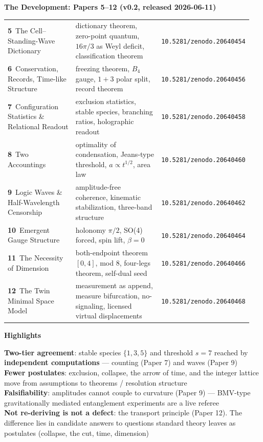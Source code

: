 \documentclass[9pt]{extarticle}
\newcommand{\secrule}[1]{{\large\bfseries\textcolor{acc}{#1}}\par\vspace{1pt}{\color{acc}\rule{\linewidth}{1.2pt}}\par\vspace{3pt}}
\newcommand{\doi}[1]{{\footnotesize\texttt{#1}}}
\begin{document}
\newpage
\begin{minipage}[t]{0.64\textwidth}
\secrule{The Development: Papers 5--12 (v0.2, released 2026-06-11)}
{\small
\begin{tabular}{@{}p{0.30\linewidth}p{0.43\linewidth}p{0.22\linewidth}@{}}
\textbf{5}\ The Cell--Standing-Wave Dictionary & dictionary theorem, zero-point quantum, $16\pi/3$ as Weyl deficit, classification theorem & \doi{10.5281/zenodo.20640454}\\[2pt]
\textbf{6}\ Conservation, Records, Time-like Structure & freezing theorem, $B_4$ gauge, $1{+}3$ polar split, record theorem & \doi{10.5281/zenodo.20640456}\\[2pt]
\textbf{7}\ Configuration Statistics \& Relational Readout & exclusion statistics, stable species, branching ratios, holographic readout & \doi{10.5281/zenodo.20640458}\\[2pt]
\textbf{8}\ Two Accountings & optimality of condensation, Jeans-type threshold, $a\propto t^{1/2}$, area law & \doi{10.5281/zenodo.20640460}\\[2pt]
\textbf{9}\ Logic Waves \& Half-Wavelength Censorship & amplitude-free coherence, kinematic stabilization, three-band structure & \doi{10.5281/zenodo.20640462}\\[2pt]
\textbf{10}\ Emergent Gauge Structure & holonomy $\pi/2$, SO(4) forced, spin lift, $\beta=0$ & \doi{10.5281/zenodo.20640464}\\[2pt]
\textbf{11}\ The Necessity of Dimension & both-endpoint theorem $[0,4]$, mod 8, four-legs theorem, self-dual seed & \doi{10.5281/zenodo.20640466}\\[2pt]
\textbf{12}\ The Twin Minimal Space Model & measurement as append, measure bifurcation, no-signaling, licensed virtual displacements & \doi{10.5281/zenodo.20640468}\\
\end{tabular}}
\end{minipage}\hfill
\begin{minipage}[t]{0.33\textwidth}
\secrule{Highlights}
{\small
\textbf{Two-tier agreement}: stable species $\{1,3,5\}$ and threshold $s=7$ reached by \textbf{independent computations} --- counting (Paper 7) and waves (Paper 9)\\[2pt]
\textbf{Fewer postulates}: exclusion, collapse, the arrow of time, and the integer lattice move from assumptions to theorems / resolution structure\\[2pt]
\textbf{Falsifiability}: amplitudes cannot couple to curvature (Paper 9) --- BMV-type gravitationally mediated entanglement experiments are a live referee\\[2pt]
\textbf{Not re-deriving is not a defect}: the transport principle (Paper 12). The difference lies in candidate answers to questions standard theory leaves as postulates (collapse, the cut, time, dimension)}
\end{minipage}
\end{document}
